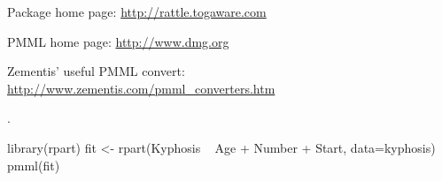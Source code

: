 \begin{Author}\relax
{}
\end{Author}
\begin{References}\relax
Package home page: \url{http://rattle.togaware.com}

PMML home page: \url{http://www.dmg.org}

Zementis' useful PMML convert: \url{http://www.zementis.com/pmml_converters.htm}
\end{References}
\begin{SeeAlso}\relax
{}.
\end{SeeAlso}
\begin{Examples}
\begin{ExampleCode}
library(rpart)
fit <- rpart(Kyphosis ~ Age + Number + Start, data=kyphosis)
pmml(fit)
\end{ExampleCode}
\end{Examples}

